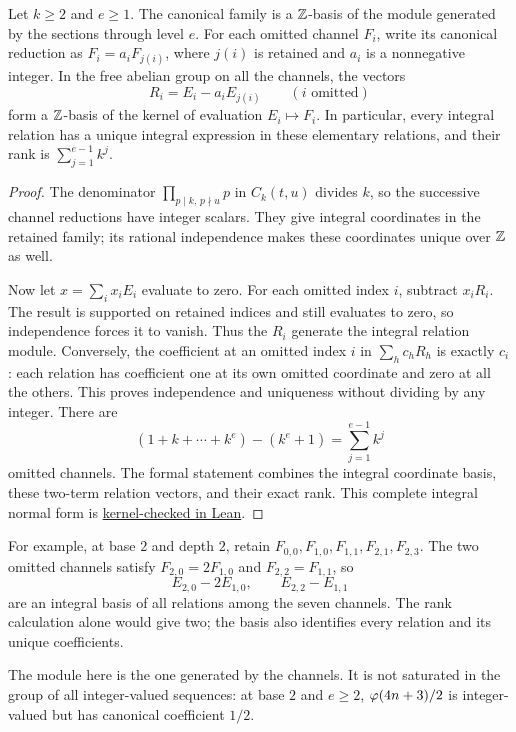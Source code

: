 \documentclass[11pt]{article}
\begin{document}
\begin{corollary}\label{cor:integral-normal-form}
Let $k\ge2$ and $e\ge1$. The canonical family is a $\mathbb{Z}$-basis of the
module generated by the sections through level $e$. For each omitted
channel $F_i$, write its canonical reduction as $F_i=a_iF_{j(i)}$, where
$j(i)$ is retained and $a_i$ is a nonnegative integer. In the free abelian
group on all the channels, the vectors
\[
 R_i=E_i-a_iE_{j(i)}\qquad(i\text{ omitted})
\]
form a $\mathbb{Z}$-basis of the kernel of evaluation $E_i\mapsto F_i$.
In particular, every integral relation has a unique integral expression
in these elementary relations, and their rank is
$\sum_{j=1}^{e-1}k^j$.
\end{corollary}
\begin{proof}
The denominator $\prod_{p\mid k,\,p\nmid u}p$ in $C_k(t,u)$ divides $k$,
so the successive channel reductions have integer scalars. They give
integral coordinates in the retained family; its rational independence
makes these coordinates unique over $\mathbb{Z}$ as well.

Now let $x=\sum_i x_iE_i$ evaluate to zero. For each omitted index $i$,
subtract $x_iR_i$. The result is supported on retained indices and still
evaluates to zero, so independence forces it to vanish. Thus the $R_i$
generate the integral relation module. Conversely, the coefficient at
an omitted index $i$ in $\sum_h c_hR_h$ is exactly $c_i$: each relation
has coefficient one at its own omitted coordinate and zero at all the
others. This proves independence and uniqueness without dividing by
any integer. There are
\[
 (1+k+\cdots+k^e)-(k^e+1)=\sum_{j=1}^{e-1}k^j
\]
omitted channels. The formal statement combines the integral coordinate
basis, these two-term relation vectors, and their exact rank.
This complete integral normal form is \href{https://github.com/wcook04/plectis-erdos/blob/25ef6245d15a47548c6926369ae8f1a0f0a14a80/ErdosProblems/Erdos249/PaperCompleteR8/KernelRelationBasis.lean#L398}{kernel-checked in Lean}.
\end{proof}

For example, at base $2$ and depth $2$, retain
$F_{0,0},F_{1,0},F_{1,1},F_{2,1},F_{2,3}$. The two omitted channels satisfy
$F_{2,0}=2F_{1,0}$ and $F_{2,2}=F_{1,1}$, so
\[
 E_{2,0}-2E_{1,0},\qquad E_{2,2}-E_{1,1}
\]
are an integral basis of all relations among the seven channels. The
rank calculation alone would give two; the basis also identifies every
relation and its unique coefficients.

The module here is the one generated by the channels. It is not saturated
in the group of all integer-valued sequences: at base $2$ and $e\ge2$,
$\varphi(4n+3)/2$ is integer-valued but has canonical coefficient $1/2$.
\end{document}
